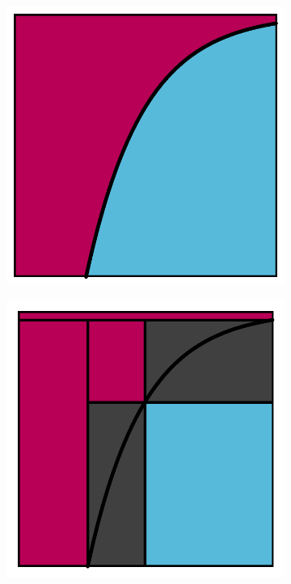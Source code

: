 \begin{figure}
  \centering
  \newcommand\twa{0.29cm}
  \newcommand\tw{0.43cm}
  \begin{subfigure}[b]{0.23\textwidth}
    \includegraphics[width=\textwidth, trim={\twa, \twa, \twa, \twa}, clip]{./figures/splitting.pdf}
    \caption{}
  \end{subfigure}
  \hfill
  \begin{subfigure}[b]{0.23\textwidth}
    \includegraphics[width=\textwidth, trim={\tw, \tw, \tw, \tw}, clip]{./figures/splitting_lvl1.pdf}

\end{subfigure}
\end{figure}

